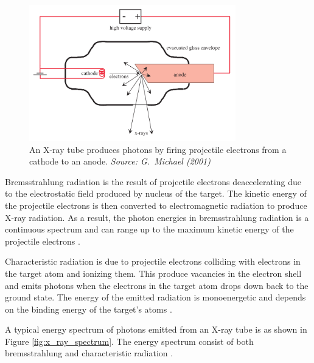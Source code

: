\documentclass[12pt]{report}
\begin{document}
\begin{figure}
\centering
\includegraphics[width=0.8\textwidth]{figures/x_ray_tube.png}
\caption{An X-ray tube produces photons by firing projectile electrons from a cathode to an anode. \emph{Source: G.~Michael (2001) \cite{michael2001x}}}
\label{fig:x_ray_tube}
\end{figure}

Bremsstrahlung radiation is the result of projectile electrons deaccelerating due to the electrostatic field produced by nucleus of the target. The kinetic energy of the projectile electrons is then converted to electromagnetic radiation to produce X-ray radiation. As a result, the photon energies in bremsstrahlung radiation is  a continuous spectrum and can range up to the maximum kinetic energy of the projectile electrons \cite{michael2001x}.

Characteristic radiation is due to projectile electrons colliding with electrons in the target atom and ionizing them. This produce vacancies in the electron shell and emits photons when the electrons in the target atom drops down back to the ground state. The energy of the emitted radiation is monoenergetic and depends on the binding energy of the target's atoms \cite{michael2001x}.

A typical energy spectrum of photons emitted from an X-ray tube is as shown in Figure \ref{fig:x_ray_spectrum}. The energy spectrum consist of both bremsstrahlung and characteristic radiation \cite{michael2001x}.
\end{document}
